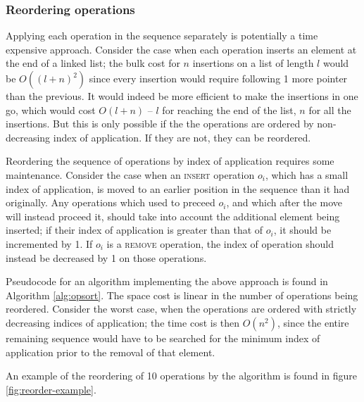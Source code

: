 \subsubsection{Reordering operations}

Applying each operation in the sequence separately is potentially a time
expensive approach. Consider the case when each operation inserts an element at
the end of a linked list; the bulk cost for $n$ insertions on a list of length
$l$ would be $O\left(\left(l+n\right)^2\right)$ since every insertion would
require following 1 more pointer than the previous.
It would indeed be more efficient to make the insertions in one go, which would
cost $O(l+n)$ -- $l$ for reaching the end of the list, $n$ for all the
insertions. But this is only possible if the the operations are ordered by
non-decreasing index of application. If they are not, they can be reordered.

Reordering the sequence of operations by index of application requires some
maintenance. Consider the case when an \textsc{insert} operation $o_i$, which
has a small index of application, is moved to an earlier position in the
sequence than it had originally. Any operations which used to preceed $o_i$, and
which after the move will instead proceed it, should take into account the
additional element being inserted; if their index of application is greater than
that of $o_i$, it should be incremented by 1. If $o_i$ is a \textsc{remove}
operation, the index of operation should instead be decreased by 1 on those
operations.

Pseudocode for an algorithm implementing the above approach is found in
Algorithm \ref{alg:opsort}. The space cost is linear in the number of operations
being reordered. Consider the worst case, when the operations are ordered with
strictly decreasing indices of application; the time cost is then
$O\left(n^2\right)$, since the entire remaining sequence would have to be
searched for the minimum index of application prior to the removal of that
element.

An example of the reordering of 10 operations by the algorithm is found in
figure \ref{fig:reorder-example}.

